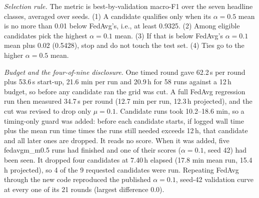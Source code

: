\emph{Selection rule.} The metric is best-by-validation macro-F1 over the seven headline
classes, averaged over seeds. (1) A candidate qualifies only when its $\alpha=0.5$ mean is no %
more than 0.01 below FedAvg's, i.e., at least 0.9325. %
(2) Among eligible candidates pick the highest %
$\alpha=0.1$ mean. (3) If that is below FedAvg's $\alpha=0.1$ mean plus 0.02 (0.5428), %
stop and do not touch the test set. (4) Ties go to the higher $\alpha=0.5$ mean. %

\emph{Budget and the four-of-nine disclosure.} One timed round gave 62.2\,s per round %
plus 53.6\,s start-up, 21.6 min per run and 20.9\,h for 58 runs against a 12\,h budget, %
so before any candidate ran the grid was cut. A full FedAvg regression run then measured
34.7\,s per round (12.7 min per run, 12.3\,h projected), and the cut was revised to drop %
only $\mu=0.1$. Candidate runs took 10.2--18.6 min, so a timing-only guard was added: %
before each candidate starts, if logged wall time plus the mean run time times the runs
still needed exceeds 12\,h, that candidate and all later ones are dropped. It reads no %
score. When it was added, five fedavgm\_m0.5 runs had finished and one of their scores %
($\alpha=0.1$, seed 42) had been seen. It dropped four candidates at 7.40\,h elapsed %
(17.8 min mean run, 15.4\,h projected), so 4 of the 9 requested candidates were run. %
Repeating FedAvg through the new code reproduced the published $\alpha=0.1$, seed-42 %
validation curve at every one of its 21 rounds (largest difference 0.0). %

